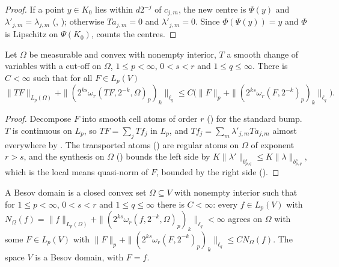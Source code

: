 \begin{proof}
\leanok
If a point $y \in K_0$ lies within $d 2^{-j}$ of $c_{j,m}$, the new centre is $\Psi(y)$ and
$\lambda'_{j,m} = \lambda_{j,m}$ (,
); otherwise $T a_{j,m} = 0$ and $\lambda'_{j,m} = 0$. Since
$\Phi(\Psi(y)) = y$ and $\Phi$ is Lipschitz on $\Psi(K_0)$,  counts
the centres.
\end{proof}

\begin{theorem}
\label{thm:diffeo-invariance}
\leanok
{}
Let $\Omega$ be measurable and convex with nonempty interior, $T$ a smooth change of variables
with a cut-off on $\Omega$, $1 \leq p < \infty$, $0 < s < r$ and $1 \leq q \leq \infty$. There is
$C < \infty$ such that for all $F \in L_p(V)$
\[
  \|T F\|_{L_p(\Omega)} + \|(2^{ks} \omega_r(T F, 2^{-k}, \Omega)_p)_k\|_{\ell_q} \leq
  C \bigl(\|F\|_p + \|(2^{ks} \omega_r(F, 2^{-k})_p)_k\|_{\ell_q}\bigr) .
\]
\end{theorem}

\begin{proof}
\leanok
Decompose $F$ into smooth cell atoms of order $r$ () for the
standard bump. $T$ is continuous on $L_p$, so $T F = \sum_j T f_j$ in $L_p$, and
$T f_j = \sum_m \lambda'_{j,m} T a_{j,m}$ almost everywhere by . The
transported atoms () are regular atoms on $\Omega$ of exponent
$r > s$, and the synthesis on $\Omega$ () bounds the left side by
$K \|\lambda'\|_{b^s_{p,q}} \leq K \|\lambda\|_{b^s_{p,q}}$, which is the local means quasi-norm of
$F$, bounded by the right side ().
\end{proof}

\begin{definition}
\label{def:besov-domain}
\leanok
{}
A Besov domain is a closed convex set $\Omega \subseteq V$ with nonempty interior such that for
$1 \leq p < \infty$, $0 < s < r$ and $1 \leq q \leq \infty$ there is $C < \infty$: every
$f \in L_p(V)$ with
$N_\Omega(f) = \|f\|_{L_p(\Omega)} + \|(2^{ks} \omega_r(f, 2^{-k}, \Omega)_p)_k\|_{\ell_q} < \infty$
agrees on $\Omega$ with some $F \in L_p(V)$ with
$\|F\|_p + \|(2^{ks} \omega_r(F, 2^{-k})_p)_k\|_{\ell_q} \leq C N_\Omega(f)$. The space $V$ is a
Besov domain, with $F = f$.
\end{definition}

